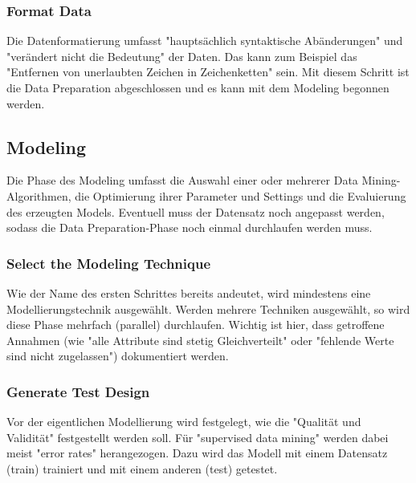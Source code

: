 \subsubsection{Format Data}
Die Datenformatierung umfasst "hauptsächlich syntaktische Abänderungen" und "verändert nicht die Bedeutung"\citep[S.~22; eigene Übersetzung]{chapman_crisp-dm_2000} der Daten. Das kann zum Beispiel das "Entfernen von unerlaubten Zeichen in Zeichenketten"\citep[S.~17; eigene Übersetzung]{shearer_crisp-dm_2000} sein.\newline
Mit diesem Schritt ist die Data Preparation abgeschlossen und es kann mit dem Modeling begonnen werden.

\subsection{Modeling}
Die Phase des Modeling umfasst die Auswahl einer oder mehrerer Data Mining-Algorithmen, die Optimierung ihrer Parameter und Settings und die Evaluierung des erzeugten Models. Eventuell muss der Datensatz noch angepasst werden, sodass die Data Preparation-Phase noch einmal durchlaufen werden muss.\citep[Punkt 1.4.1.4]{larose_discovering_2014}

\subsubsection{Select the Modeling Technique}
Wie der Name des ersten Schrittes bereits andeutet, wird mindestens eine Modellierungstechnik ausgewählt. Werden mehrere Techniken ausgewählt, so wird diese Phase mehrfach (parallel) durchlaufen. Wichtig ist hier, dass getroffene Annahmen (wie "alle Attribute sind stetig Gleichverteilt" oder "fehlende Werte sind nicht zugelassen"\citep[S.~24]{chapman_crisp-dm_2000}) dokumentiert werden.\citep[S.~17]{shearer_crisp-dm_2000}

\subsubsection{Generate Test Design}
Vor der eigentlichen Modellierung wird festgelegt, wie die "Qualität und Validität"\citep[S.~24]{chapman_crisp-dm_2000} festgestellt werden soll. Für "supervised data mining" werden dabei meist "error rates"\citep[S.~24]{chapman_crisp-dm_2000} herangezogen. Dazu wird das Modell mit einem Datensatz (\gls{train}) trainiert und mit einem anderen (\gls{test}) getestet.\citep{shearer_crisp-dm_2000}

